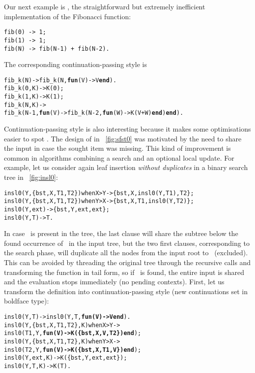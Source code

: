 Our next example is , the straightforward but extremely
inefficient implementation of the Fibonacci function:
\begin{verbatim}
fib(0) -> 1;
fib(1) -> 1;
fib(N) -> fib(N-1) + fib(N-2).
\end{verbatim}
The corresponding continuation\hyp{}passing style is
\begin{alltt}
fib\_k(N)   -> fib\_k(N,\textbf{fun}(V) -> V \textbf{end}).
fib\_k(0,K) -> K(0);
fib\_k(1,K) -> K(1);
fib\_k(N,K) ->
  fib\_k(N-1,\textbf{fun}(V) -> fib\_k(N-2,\textbf{fun}(W) -> K(V+W) \textbf{end}) \textbf{end}).
\end{alltt}

 Continuation\hyp{}passing
style is also interesting because it makes some optimisations easier
to spot \citep{Danvy_2004}. The design of  in
\fig~\vref{fig:sfst0} was motivated by the need to share the input in
case the sought item was missing. This kind of improvement is common
in algorithms combining a search and an optional local update. For
example, let us consider again leaf insertion \emph{without
  duplicates} in a binary search tree in
\fig~\vref{fig:insl0}:
\begin{alltt}
insl0(Y,\{bst,X,T1,T2\}) when X > Y -> \{bst,X,insl0(Y,T1),T2\};
insl0(Y,\{bst,X,T1,T2\}) when Y > X -> \{bst,X,T1,insl0(Y,T2)\};
insl0(Y,          ext)            -> \{bst,Y,ext,ext\};
insl0(Y,            T)            -> T.
\end{alltt}
In case ~is present in the tree, the last clause will share
the subtree below the found occurrence of~ in the input
tree, but the two first clauses, corresponding to the search phase,
will duplicate all the nodes from the input root to~
(excluded). This can be avoided by threading the original tree through
the recursive calls and transforming the function in tail form, so
if~ is found, the entire input is shared and the evaluation
stops immediately (no pending contexts). First, let us transform the
definition into continuation\hyp{}passing style (new continuations set
in boldface type):
\begin{alltt}
insl0(Y,T)               -> insl0(Y,T,\textbf{fun(V) -> V end}).
insl0(Y,\{bst,X,T1,T2\},K) when X > Y ->
\hfill{}insl0(T1,Y,\textbf{fun(V) -> K(\{bst,X,V,T2\}) end});
insl0(Y,\{bst,X,T1,T2\},K) when Y > X ->
\hfill{}insl0(T2,Y,\textbf{fun(V) -> K(\{bst,X,T1,V\}) end});
insl0(Y,          ext,K) -> K(\{bst,Y,ext,ext\});
insl0(Y,            T,K) -> K(T).
\end{alltt}
